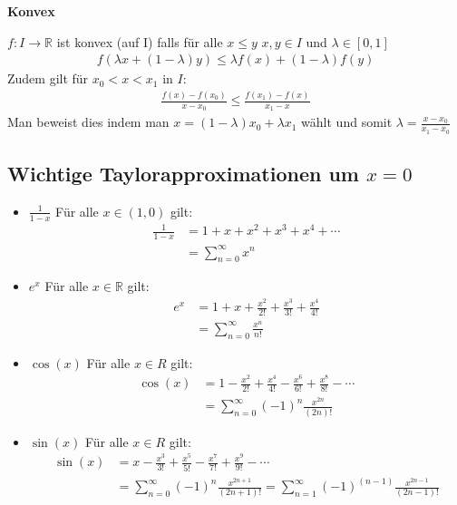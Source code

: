 \documentclass[25pt]{sciposter}
\newcommand{\R}{\mathbb{R}}
\newenvironment{method}[1]{\begin{mdframed}[backgroundcolor=blue!10,innertopmargin=15pt, innerbottommargin=15pt,nobreak=true]
		\textbf{#1 }
	}
	{ 
	\end{mdframed}
}
\begin{document}
\begin{multicols}{3}
\begin{method}{Konvex}
	$f : I \to \R$ ist konvex (auf I) falls für alle $x \leq y$ $x,y \in I$ und $\lambda \in [0,1]$
	\begin{align*}
	f(\lambda x + (1-\lambda)y) \leq \lambda f(x) + (1-\lambda)f(y)
	\end{align*}
	Zudem gilt für $x_0 < x< x_1$ in $I$:
	\begin{align*}
	 \frac{f(x) - f(x_0)}{x-x_0} \leq \frac{f(x_1) - f(x)}{x_1 - x}
	\end{align*}
	Man beweist dies indem man $x = (1-\lambda) x_0 + \lambda x_1$ wählt und somit $\lambda = \frac{x-x_0}{x_1 - x_0}$
\end{method}




\subsection*{Wichtige Taylorapproximationen um $x=0$}
\begin{itemize}
	\item $\boxed{\frac{1}{1-x}}$ Für alle $x \in (1,0)$ gilt:
	\begin{align*}
	{\frac{1}{1-x}} &= 1 + x + x^2 + x^3 + x^4 + \cdots \\
	&= \sum_{n=0}^{\infty} x^n
	\end{align*}	
	
	\item $\boxed{e^x}$ Für alle $x \in \R$ gilt:
	\begin{align*}
		e^x &= 1 + x + \frac{x^2}{2!} + \frac{x^3}{3!} + \frac{x^4}{4!}\\
		&= \sum_{n=0}^{\infty} \frac{x^n}{n!}
	\end{align*}
	
	\item $\boxed{\cos(x)}$ Für alle $x\in R$ gilt:
	\begin{align*}
	\cos(x) &= 1 - \frac{x^2}{2!} + \frac{x^4}{4!} - \frac{x^6}{6!} + \frac{x^8}{8!} - \cdots  \\
	&= \sum_{n=0}^{\infty} (-1)^n \frac{x^{2n}}{(2n)!}
	\end{align*}
	
	\item $\boxed{\sin(x)}$ Für alle $x\in R$ gilt:
	\begin{align*}
	\sin(x) &=  x - \frac{x^3}{3!} + \frac{x^5}{5!} - \frac{x^7}{7!} + \frac{x^9}{9!} - \cdots\\
	&= \sum_{n=0}^{\infty} (-1)^n \frac{x^{2n+1}}{(2n+1)!} = \sum_{n=1}^{\infty} (-1)^{(n-1)} \frac{x^{2n-1}}{(2n-1)!}
	\end{align*}


\end{itemize}
\end{multicols}
\end{document}
